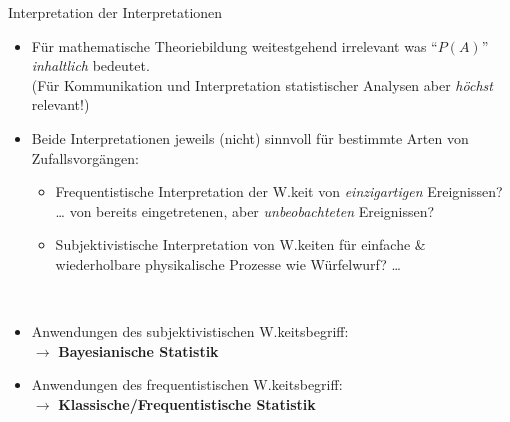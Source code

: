 \documentclass[
  10pt,
  ignorenonframetext,
]{beamer}
\providecommand{\tightlist}{%
  \setlength{\itemsep}{0pt}\setlength{\parskip}{0pt}}
\begin{document}
\begin{frame}{Interpretation der Interpretationen}
\label{interpretation-der-interpretationen}
\begin{itemize}
\item
  Für mathematische Theoriebildung weitestgehend irrelevant was
  ``\(P(A)\)'' \emph{inhaltlich} bedeutet.\\
  (Für Kommunikation und Interpretation statistischer Analysen aber
  \emph{höchst} relevant!)
\item
  Beide Interpretationen jeweils (nicht) sinnvoll für bestimmte Arten
  von Zufallsvorgängen:

  \begin{itemize}
  \tightlist
  \item
    Frequentistische Interpretation der W.keit von \emph{einzigartigen}
    Ereignissen? \ldots{} von bereits eingetretenen, aber
    \emph{unbeobachteten} Ereignissen?
  \item
    Subjektivistische Interpretation von W.keiten für einfache \&
    wiederholbare physikalische Prozesse wie Würfelwurf? \ldots{}\\
    \strut \\
  \end{itemize}
\item
  Anwendungen des subjektivistischen W.keitsbegriff:\\
  \(\to\) \textbf{Bayesianische Statistik}
\item
  Anwendungen des frequentistischen W.keitsbegriff:\\
  \(\to\) \textbf{Klassische/Frequentistische Statistik}
\end{itemize}

\end{frame}
\end{document}
